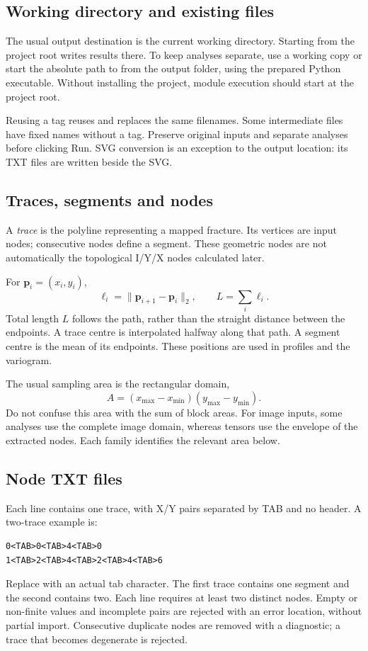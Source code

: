 \subsection{Working directory and existing files}
The usual output destination is the current working directory. Starting from the project root writes results there. To keep analyses separate, use a working copy or start the absolute path to  from the output folder, using the prepared Python executable. Without installing the project, module execution should start at the project root.

Reusing a tag reuses and replaces the same filenames. Some intermediate files have fixed names without a tag. Preserve original inputs and separate analyses before clicking Run. SVG conversion is an exception to the output location: its TXT files are written beside the SVG.

\label{sec:dados}
\subsection{Traces, segments and nodes}
A \emph{trace} is the polyline representing a mapped fracture. Its vertices are input nodes; consecutive nodes define a segment. These geometric nodes are not automatically the topological I/Y/X nodes calculated later.

For \(\mathbf p_i=(x_i,y_i)\),
\begin{equation}
\ell_i=\|\mathbf p_{i+1}-\mathbf p_i\|_2,
\qquad L=\sum_i\ell_i.
\end{equation}
Total length \(L\) follows the path, rather than the straight distance between the endpoints. A trace centre is interpolated halfway along that path. A segment centre is the mean of its endpoints. These positions are used in profiles and the variogram.

The usual sampling area is the rectangular domain,
\begin{equation}
A=(x_{\max}-x_{\min})(y_{\max}-y_{\min}).
\end{equation}
Do not confuse this area with the sum of block areas. For image inputs, some analyses use the complete image domain, whereas tensors use the envelope of the extracted nodes. Each family identifies the relevant area below.

\subsection{Node TXT files}
Each line contains one trace, with X/Y pairs separated by TAB and no header. A two-trace example is:
\begin{verbatim}
0<TAB>0<TAB>4<TAB>0
1<TAB>2<TAB>4<TAB>2<TAB>4<TAB>6
\end{verbatim}
Replace  with an actual tab character. The first trace contains one segment and the second contains two. Each line requires at least two distinct nodes. Empty or non-finite values and incomplete pairs are rejected with an error location, without partial import. Consecutive duplicate nodes are removed with a diagnostic; a trace that becomes degenerate is rejected.

